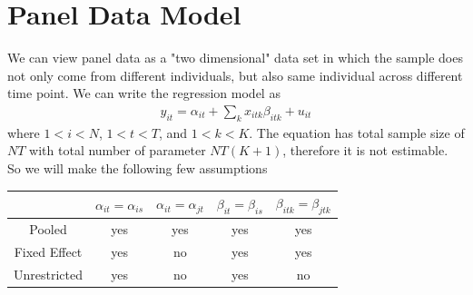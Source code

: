 \documentclass[a4paper]{article}
\begin{document}
\section{Panel Data Model}
We can view panel data as a "two dimensional" data set in which the sample does not only come from different individuals, but also same individual across different time point.  We can write the regression model as
\begin{align*}
y_{it} = \alpha_{it} + \sum_k x_{itk} \beta_{itk} + u_{it}
\end{align*}
where $1<i<N$, $1<t<T$, and $1<k<K$. The equation has total sample size of $NT$ with total number of parameter $NT(K+1)$, therefore it is not estimable. So we will make the following few assumptions\\
\begin{tabular}{c |c | c | c | c}
&$\alpha_{it} = \alpha_{is}$ & $\alpha_{it} = \alpha_{jt}$ & $\beta_{it} = \beta_{is}$ & $\beta_{itk} = \beta_{jtk}$\\ 
\hline
Pooled&yes&yes&yes&yes\\
Fixed Effect&yes&no&yes&yes\\
Unrestricted&yes&no&yes&no\\
\end{tabular}
\end{document}
